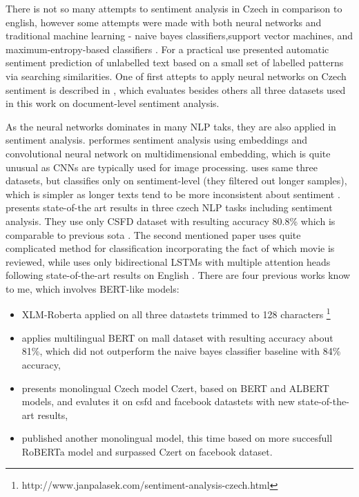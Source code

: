 There is not so many attempts to sentiment analysis in Czech in comparison to english, however some attempts were made with both neural networks and traditional machine learning - naive bayes classifiers,support vector machines, and maximum-entropy-based classifiers \citep{Veselovska}.  %
For a practical use \citep{Zizka} presented automatic sentiment prediction of unlabelled text based on a small set of labelled patterns via searching similarities.  One of first attepts to apply neural networks on Czech sentiment is described in \citep{Lenc}, which evaluates besides others all three datasets used in this work on document-level sentiment analysis. 

As the neural networks dominates in many NLP taks, they are also applied in sentiment analysis. \citep{kysely} performes sentiment analysis using embeddings and convolutional neural network on multidimensional embedding, which is quite unusual as CNNs are typically used for image processing. \citep{kysely} uses same three datasets, but classifies only on sentiment-level (they filtered out longer samples), which is simpler as longer texts tend to be more inconsistent about sentiment \citep{Veselovska}. \citep{Libovicky} presents state-of-the art results in three czech NLP tasks including sentiment analysis. They use only CSFD dataset with resulting accuracy 80.8\% which is comparable to previous \acrshort{sota} \citep{Brychcin2013}. The second mentioned paper uses quite complicated method for classification incorporating the fact of which movie is reviewed, while \citep{Libovicky} uses only bidirectional LSTMs with multiple attention heads following state-of-the-art results on English \citep{Lin2017}. There are four previous works know to me, which involves BERT-like models: 
\begin{itemize}
\item XLM-Roberta applied on all three datastets trimmed to 128 characters \footnote{http://www.janpalasek.com/sentiment-analysis-czech.html}
\item \citep{Klouda} applies multilingual BERT on mall dataset with resulting accuracy about  81\%, which did not outperform the naive bayes classifier baseline with 84\% accuracy, 
\item  \citep{Sido2021} presents monolingual Czech model Czert,  based on BERT and ALBERT models, and evalutes it on csfd and facebook datastets with new state-of-the-art results,
\item \citep{Straka2021} published another monolingual model, this time based on more succesfull RoBERTa model and surpassed Czert on facebook dataset.


\end{itemize}


